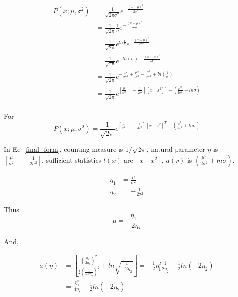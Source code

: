 \documentclass{article}
\begin{document}
\begin{align*}
  P(x; \mu, \sigma^2) & =\frac{1}{\sqrt{2\pi\sigma^2}}e^{-\frac{(x-\mu)^2}{2\sigma^2}}                                                       \\
                      & =\frac{1}{\sqrt{2\pi}}\frac{1}{\sigma}e^{-\frac{(x-\mu)^2}{2\sigma^2}}                                               \\
                      & =\frac{1}{\sqrt{2\pi}}e^{ln{\frac{1}{\sigma}}}e^{-\frac{(x-\mu)^2}{2\sigma^2}}                                       \\
                      & =\frac{1}{\sqrt{2\pi}}e^{-ln(\sigma)-\frac{(x-\mu)^2}{2\sigma^2}}                                                    \\
                      & =\frac{1}{\sqrt{2\pi}}e^{-\frac{x^2}{2\sigma^2}+\frac{\mu x}{\sigma^2}-\frac{\mu^2}{2\sigma^2}+ln(\frac{1}{\sigma})} \\
                      & =\frac{1}{\sqrt{2\pi}}e^{[
      \frac{\mu}{\sigma^2}\quad-\frac{1}{2\sigma^2}]
    [x\quad x^2]^T-\left(\frac{\mu^2}{2\sigma^2}+ln\sigma\right)}                                                                            \\
\end{align*}

For
\begin{equation}\label{final_form}
  P(x; \mu, \sigma^2)= \frac{1}{\sqrt{2\pi}}e^{[
      \frac{\mu}{\sigma^2}\quad-\frac{1}{2\sigma^2}]
    [x\quad x^2]^T-\left(\frac{\mu^2}{2\sigma^2}+ln\sigma\right)}
\end{equation}

In Eq~\ref{final_form}, counting measure is $1/\sqrt{2\pi}$, natural parameter $\eta$ is $[
      \frac{\mu}{\sigma^2}\quad-\frac{1}{2\sigma^2}]$, sufficient statistics $t(x)$ are $[x\quad x^2]$, $a(\eta)$ is $\left(\frac{\mu^2}{2\sigma^2}+ln\sigma\right)$.

\begin{align*}
  \eta_1 & =\frac{\mu}{\sigma^2} \\
  \eta_2 & =-\frac{1}{2\sigma^2}
\end{align*}

Thus,
$$
  \mu=\frac{\eta_1}{-2\eta_2}
$$

And,

\begin{align*}
  a(\eta) & =\left[\frac{(\frac{\eta_1}{2\eta_2})^2}{2(\frac{1}{-2\eta_2})^2}+ln\sqrt{\frac{1}{-2\eta_2}}\right]=-\frac{1}{2}\eta_1^2\frac{1}{2\eta_2}-\frac{1}{2}ln(-2\eta_2) \\
          & =\frac{\eta_1^2}{4\eta_2}-\frac{1}{2}ln(-2\eta_2)                                                                                                                  \\
\end{align*}
\end{document}

